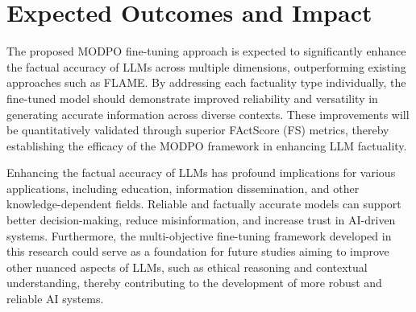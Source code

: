 \documentclass{article}
\begin{document}
\section{Expected Outcomes and Impact}

The proposed MODPO fine-tuning approach is expected to significantly enhance the factual accuracy of LLMs across multiple dimensions, outperforming existing approaches such as FLAME. By addressing each factuality type individually, the fine-tuned model should demonstrate improved reliability and versatility in generating accurate information across diverse contexts. These improvements will be quantitatively validated through superior FActScore (FS) metrics, thereby establishing the efficacy of the MODPO framework in enhancing LLM factuality.

Enhancing the factual accuracy of LLMs has profound implications for various applications, including education, information dissemination, and other knowledge-dependent fields. Reliable and factually accurate models can support better decision-making, reduce misinformation, and increase trust in AI-driven systems. Furthermore, the multi-objective fine-tuning framework developed in this research could serve as a foundation for future studies aiming to improve other nuanced aspects of LLMs, such as ethical reasoning and contextual understanding, thereby contributing to the development of more robust and reliable AI systems.

\clearpage


\end{document}
